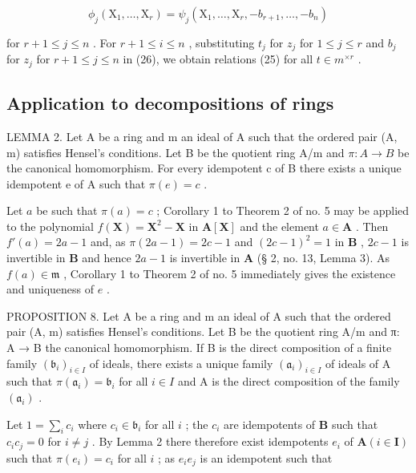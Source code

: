 \[
\phi_ {j} \left(\mathrm{X} _ {1}, \dots , \mathrm{X} _ {r}\right) = \psi_ {j} \left(\mathrm{X} _ {1}, \dots , \mathrm{X} _ {r}, - b _ {r + 1}, \dots , - b _ {n}\right)
\]

for \(r + 1 \leqslant j \leqslant n\) . For \(r + 1 \leqslant i \leqslant n\) , substituting \(t_j\) for \(z_j\) for \(1 \leqslant j \leqslant r\) and \(b_j\) for \(z_j\) for \(r + 1 \leqslant j \leqslant n\) in (26), we obtain relations (25) for all \(t \in m^{\times r}\) .

\subsection{Application to decompositions of rings}

LEMMA 2. Let A be a ring and m an ideal of A such that the ordered pair (A, m) satisfies Hensel's conditions. Let B be the quotient ring A/m and \(\pi: A \to B\) be the canonical homomorphism. For every idempotent c of B there exists a unique idempotent e of A such that \(\pi(e) = c\) .

Let \(a\) be such that \(\pi(a) = c\) ; Corollary 1 to Theorem 2 of no. 5 may be applied to the polynomial \(f(\mathbf{X}) = \mathbf{X}^2 - \mathbf{X}\) in \(\mathbf{A}[\mathbf{X}]\) and the element \(a \in \mathbf{A}\) . Then \(f'(a) = 2a - 1\) and, as \(\pi(2a - 1) = 2c - 1\) and \((2c - 1)^2 = 1\) in \(\mathbf{B}\) , \(2c - 1\) is invertible in \(\mathbf{B}\) and hence \(2a - 1\) is invertible in \(\mathbf{A}\) (§ 2, no. 13, Lemma 3). As \(f(a) \in \mathfrak{m}\) , Corollary 1 to Theorem 2 of no. 5 immediately gives the existence and uniqueness of \(e\) .

PROPOSITION 8. Let A be a ring and m an ideal of A such that the ordered pair (A, m) satisfies Hensel's conditions. Let B be the quotient ring A/m and π: A → B the canonical homomorphism. If B is the direct composition of a finite family \((\mathfrak{b}_{i})_{i\in I}\) of ideals, there exists a unique family \((\mathfrak{a}_{i})_{i\in I}\) of ideals of A such that \(\pi(\mathfrak{a}_{i}) = \mathfrak{b}_{i}\) for all \(i \in I\) and A is the direct composition of the family \((\mathfrak{a}_{i})\) .

Let \(1 = \sum_{i} c_{i}\) where \(c_{i} \in \mathfrak{b}_{i}\) for all \(i\) ; the \(c_{i}\) are idempotents of \(\mathbf{B}\) such that \(c_{i}c_{j} = 0\) for \(i \neq j\) . By Lemma 2 there therefore exist idempotents \(e_{i}\) of \(\mathbf{A} (i \in \mathbf{I})\) such that \(\pi(e_{i}) = c_{i}\) for all \(i\) ; as \(e_{i}e_{j}\) is an idempotent such that


